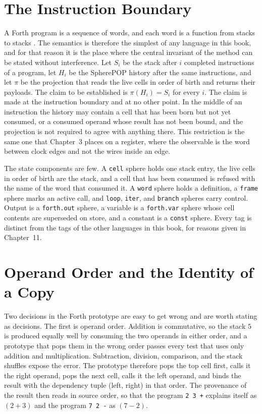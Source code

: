 \documentclass[11pt,oneside]{report}
\newcommand{\SP}{SpherePOP}
\theoremstyle{plain}
\theoremstyle{definition}
\theoremstyle{remark}
\begin{document}
\section{The Instruction Boundary}

A Forth program is a sequence of words, and each word is a function from stacks to stacks \cite{moore74,brodie,ansi-forth}. The semantics is therefore the simplest of any language in this book, and for that reason it is the place where the central invariant of the method can be stated without interference. Let $S_i$ be the stack after $i$ completed instructions of a program, let $H_i$ be the \SP{} history after the same instructions, and let $\pi$ be the projection that reads the live cells in order of birth and returns their payloads. The claim to be established is $\pi(H_i)=S_i$ for every $i$. The claim is made at the instruction boundary and at no other point. In the middle of an instruction the history may contain a cell that has been born but not yet consumed, or a consumed operand whose result has not been bound, and the projection is not required to agree with anything there. This restriction is the same one that Chapter~3 places on a register, where the observable is the word between clock edges and not the wires inside an edge.

The state components are few. A \texttt{cell} sphere holds one stack entry, the live cells in order of birth are the stack, and a cell that has been consumed is refused with the name of the word that consumed it. A \texttt{word} sphere holds a definition, a \texttt{frame} sphere marks an active call, and \texttt{loop}, \texttt{iter}, and \texttt{branch} spheres carry control. Output is a \texttt{forth.out} sphere, a variable is a \texttt{forth.var} sphere whose cell contents are superseded on store, and a constant is a \texttt{const} sphere. Every tag is distinct from the tags of the other languages in this book, for reasons given in Chapter~11.

\section{Operand Order and the Identity of a Copy}

Two decisions in the Forth prototype are easy to get wrong and are worth stating as decisions. The first is operand order. Addition is commutative, so the stack $5$ is produced equally well by consuming the two operands in either order, and a prototype that pops them in the wrong order passes every test that uses only addition and multiplication. Subtraction, division, comparison, and the stack shuffles expose the error. The prototype therefore pops the top cell first, calls it the right operand, pops the next cell, calls it the left operand, and binds the result with the dependency tuple (left, right) in that order. The provenance of the result then reads in source order, so that the program \texttt{2 3 +} explains itself as $(2 + 3)$ and the program \texttt{7 2 -} as $(7 - 2)$.
\end{document}
